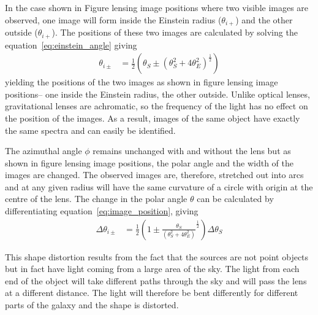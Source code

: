         In the case shown in Figure lensing image positions where two visible images are observed, one image will form inside the Einstein radius ($\theta_{i+}$) and the other outside ($\theta_{i+}$). The positions of these two images are calculated by solving the equation~\ref{eq:einstein_angle} giving 
        \begin{align}
            \theta_{i\pm} &= \frac{1}{2}\left( \theta_S \pm {(\theta_S^2 + 4\theta_E^2)} ^{\frac{1}{2}} \right) \label{eq:image_position}
        \end{align}
        yielding the positions of the two images as shown in figure lensing image positions– one inside the Einstein radius, the other outside. Unlike optical lenses, gravitational lenses are achromatic, so the frequency of the light has no effect on the position of the images. As a result, images of the same object have exactly the same spectra and can easily be identified\cite{Hartle}.

        The azimuthal angle $\phi$ remains unchanged with and without the lens but as shown in figure lensing image positions, the polar angle and the width of the images are changed. The observed images are, therefore, stretched out into arcs and at any given radius will have the same curvature of a circle with origin at the centre of the lens\cite{Image_arc_curvature}. The change in the polar angle $\theta$ can be calculated by differentiating equation~\ref{eq:image_position}, giving 
        \begin{align}
            \Delta\theta_{i\pm} &= \frac{1}{2}\left( 1 \pm \frac{\theta_S}{(\theta_S^2 +4\theta_E^2)}^{\frac{1}{2}} \right) \Delta\theta_S
        \end{align}

        This shape distortion results from the fact that the sources are not point objects but in fact have light coming from a large area of the sky. The light from each end of the object will take different paths through the sky and will pass the lens at a different distance. The light will therefore be bent differently for different parts of the galaxy and the shape is distorted\cite{Arc_shapes_site}.

